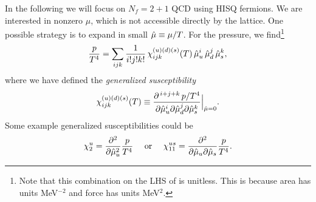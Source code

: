 In the following we will focus on $N_f=2+1$ QCD using HISQ fermions. We are
interested in nonzero $\mu$, which is not accessible directly by the lattice.
One possible strategy is to expand in small $\hat{\mu}\equiv\mu/T$. For the
pressure, we find\footnote{Note that this combination on the LHS of 
 is unitless. This is because area has units
MeV$^{-2}$ and force has units MeV$^2$.}
\begin{equation}\label{eq:pxpac}
\frac{p}{T^4}=\sum_{ijk}\frac{1}{i!j!k!}\,\chi_{ijk}^{(u)(d)(s)}(T)\,
               \hat{\mu}_u^i\,\hat{\mu}_d^j\,\hat{\mu}_s^k,
\end{equation}
where we have defined the {\it generalized
susceptibility}
\begin{equation}
\chi_{ijk}^{(u)(d)(s)}(T)
  \equiv\frac{\partial^{\,i+j+k}\,p/T^4}{\partial\hat{\mu}_u^i\partial\hat{\mu}_d^j
                                       \partial\hat{\mu}_s^k}\Big|_{\hat{\mu}=0}.
\end{equation}
Some example generalized susceptibilities could be
\begin{equation}
  \chi_2^u=\frac{\partial^2}{\partial\hat{\mu}_u^2}\frac{p}{T^4}
  ~~~~\text{or}~~~~
  \chi_{11}^{us}=\frac{\partial^2}{\partial\hat{\mu}_u\partial\hat{\mu}_s}\frac{p}{T^4}.
\end{equation}

